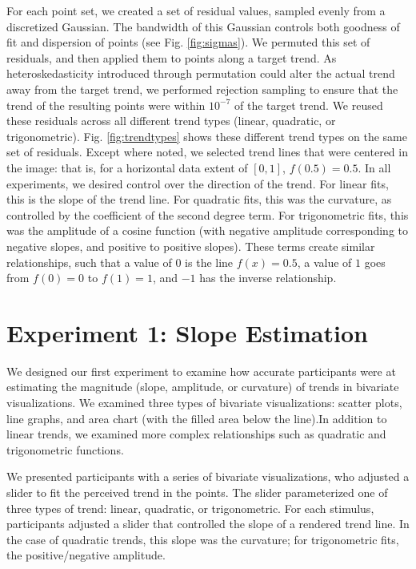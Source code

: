\documentclass{sigchi}
\begin{document}
For each point set, we created a set of residual values, sampled evenly from a discretized Gaussian. The bandwidth of this Gaussian controls both goodness of fit and dispersion of points (see Fig. \ref{fig:sigmas}). We permuted this set of residuals, and then applied them to points along a target trend. As heteroskedasticity introduced through permutation could alter the actual trend away from the target trend, we performed rejection sampling to ensure that the trend of the resulting points were within $10^{-7}$ of the target trend. We reused these residuals across all different trend types (linear, quadratic, or trigonometric). Fig. \ref{fig:trendtypes} shows these different trend types on the same set of residuals. Except where noted, we selected trend lines that were centered in the image: that is, for a horizontal data extent of $[0,1]$, $f(0.5) = 0.5$. In all experiments, we desired control over the direction of the trend. For linear fits, this is the slope of the trend line. For quadratic fits, this was the curvature, as controlled by the coefficient of the second degree term. For trigonometric fits, this was the amplitude of a cosine function (with negative amplitude corresponding to negative slopes, and positive to positive slopes). These terms create similar relationships, such that a value of $0$ is the line $f(x)=0.5$, a value of $1$ goes from $f(0)=0$ to $f(1)=1$, and $-1$ has the inverse relationship.


\section{Experiment 1: Slope Estimation}

We designed our first experiment to examine how accurate participants were at estimating the magnitude (slope, amplitude, or curvature) of trends in bivariate visualizations. We examined three types of bivariate visualizations: scatter plots, line graphs, and area chart (with the filled area below the line).In addition to linear trends, we examined more complex relationships such as quadratic and trigonometric functions.

We presented participants with a series of bivariate visualizations, who adjusted a slider to fit the perceived trend in the points. The slider parameterized one of three types of trend: linear, quadratic, or trigonometric. For each stimulus, participants adjusted a slider that controlled the slope of a rendered trend line. In the case of quadratic trends, this slope was the curvature; for trigonometric fits, the positive/negative amplitude. 
\end{document}
